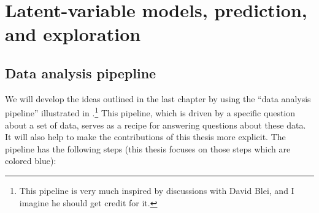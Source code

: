 \label{sec:pipeline}

\section{Latent-variable models, prediction, and exploration}

\subsection{Data analysis pipepline}
\label{sec:data_analysis_pipeline}
We will develop the ideas outlined in the last chapter by using the
``data analysis pipeline'' illustrated in
.\footnote{This pipeline is very much
  inspired by discussions with David Blei, and I imagine he should get
  credit for it.} This pipeline, which is driven by a specific question
about a set of data, serves as a recipe for answering questions about
these data.  It will also help to make the contributions of this
thesis more explicit. The pipeline has the following steps (this
thesis focuses on those steps which are colored blue):

